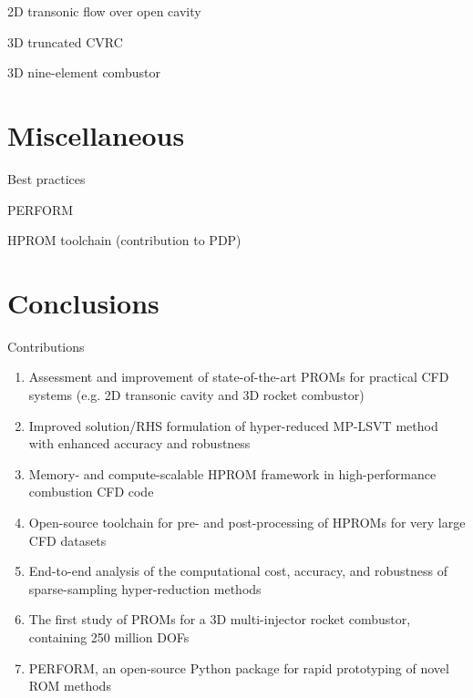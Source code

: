 \documentclass[]{beamer}
\begin{document}
\begin{frame}{2D transonic flow over open cavity}
    
\end{frame}

\begin{frame}{3D truncated CVRC}
    
\end{frame}

\begin{frame}{3D nine-element combustor}
    
\end{frame}

\section*{Miscellaneous}

\begin{frame}{Best practices}
	
\end{frame}

\begin{frame}{PERFORM}
\end{frame}

\begin{frame}{HPROM toolchain (contribution to PDP)}
\end{frame}

\section*{Conclusions}

\begin{frame}{Contributions}
    \begin{enumerate}
        \item Assessment and improvement of state-of-the-art PROMs for practical CFD systems (e.g. 2D transonic cavity and 3D rocket combustor)
        \item Improved solution/RHS formulation of hyper-reduced MP-LSVT method with enhanced accuracy and robustness
        \item Memory- and compute-scalable HPROM framework in high-performance combustion CFD code
        \item Open-source toolchain for pre- and post-processing of HPROMs for very large CFD datasets
        \item End-to-end analysis of the computational cost, accuracy, and robustness of sparse-sampling hyper-reduction methods
        \item The first study of PROMs for a 3D multi-injector rocket combustor, containing 250 million DOFs
        \item PERFORM, an open-source Python package for rapid prototyping of novel ROM methods
    \end{enumerate}
\end{frame}
\end{document}
